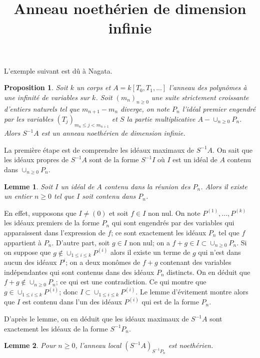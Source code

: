 \documentclass{article}
\newtheorem{proposition}{Proposition}
\newtheorem{lemme}{Lemme}
\begin{document}
\title{Anneau noethérien de dimension infinie}
\maketitle

L'exemple suivant est dû à Nagata.
\begin{proposition}
Soit $k$ un corps et $A = k[T_0, T_1, ...]$ l'anneau des polynômes à une infinité de variables sur $k$. Soit $(m_n)_{n \geq 0}$ une suite strictement croissante d'entiers naturels tel que $m_{n+1} - m_n$ diverge, on note $P_n$ l'idéal premier engendré par les variables $(T_j)_{m_n \leq j < m_{n+1}}$ et $S$ la partie multiplicative $A-\cup_{n \geq 0}P_n$. Alors $S^{-1}A$ est un anneau noethérien de dimension infinie.
\end{proposition}

La première étape est de comprendre les idéaux maximaux de $S^{-1}A$.
On sait que les idéaux propres de $S^{-1}A$ sont de la forme $S^{-1}I$ où $I$ est un idéal de $A$ contenu dans $\cup_{n \geq 0}P_n$.

\begin{lemme}
Soit $I$ un idéal de $A$ contenu dans la réunion des $P_n$. Alors il existe un entier $n \geq 0$ tel que $I$ soit contenu dans $P_n$.
\end{lemme}

En effet, supposons que $I \neq (0)$ et soit $f \in I$ non nul. On note $P^{(1)}, ..., P^{(k)}$ les idéaux premiers de la forme $P_n$ qui sont engendrés par des variables qui apparaissent dans l'expression de $f$; ce sont exactement les idéaux $P_n$ tel que $f$ appartient à $P_n$. D'autre part, soit $g \in I$ non nul; on a $f+g \in I \subset \cup_{n \geq 0}P_n$. Si on suppose que $g \not\in \cup_{1 \leq i \leq k}P^{(i)}$ alors il existe un terme de $g$ qui n'est dans aucun des idéaux $P^i$; on a deux monômes de $f+g$ contenant des variables indépendantes qui sont contenus dans des idéaux $P_n$ distincts. On en déduit que $f+g \not\in \cup_{n \geq 0}P_n$; ce qui est une contradiction. Ce qui montre que $g \in \cup_{1 \leq i \leq k}P^{(i)}$; donc $I \subset \cup_{1 \leq i \leq k}P^{(i)}$. Le lemme d'évitement montre alors que $I$ est contenu dans l'un des idéaux $P^{(i)}$ qui est de la forme $P_n$.

D'après le lemme, on en déduit que les idéaux maximaux de $S^{-1}A$ sont exactement les idéaux de la forme $S^{-1}P_n$.
\begin{lemme}
Pour $n \geq 0$, l'anneau local $(S^{-1}A)_{S^{-1}P_n}$ est noethérien.
\end{lemme}
\end{document}
